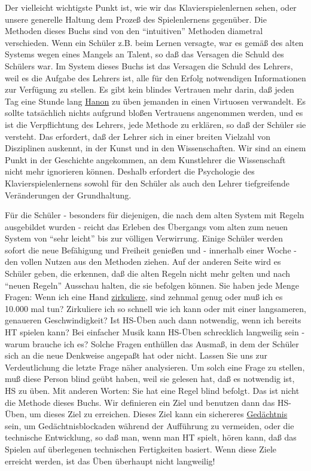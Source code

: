 Der vielleicht wichtigste Punkt ist, wie wir das Klavierspielenlernen sehen, oder unsere generelle Haltung dem Prozeß des Spielenlernens gegenüber.
Die Methoden dieses Buchs sind von den \enquote{intuitiven} Methoden diametral verschieden.
Wenn ein Schüler z.B. beim Lernen versagte, war es gemäß des alten Systems wegen eines Mangels an Talent, so daß das Versagen die Schuld des Schülers war.
Im System dieses Buchs ist das Versagen die Schuld des Lehrers, weil es die Aufgabe des Lehrers ist, alle für den Erfolg notwendigen Informationen zur Verfügung zu stellen.
Es gibt kein blindes Vertrauen mehr darin, daß jeden Tag eine Stunde lang \hyperlink{c1iii7h}{Hanon} zu üben jemanden in einen Virtuosen verwandelt.
Es sollte tatsächlich nichts aufgrund bloßen Vertrauens angenommen werden, und es ist die Verpflichtung des Lehrers, jede Methode zu erklären, so daß der Schüler sie versteht.
Das erfordert, daß der Lehrer sich in einer breiten Vielzahl von Disziplinen auskennt, in der Kunst und in den Wissenschaften.
Wir sind an einem Punkt in der Geschichte angekommen, an dem Kunstlehrer die Wissenschaft nicht mehr ignorieren können.
Deshalb erfordert die Psychologie des Klavierspielenlernens sowohl für den Schüler als auch den Lehrer tiefgreifende Veränderungen der Grundhaltung.

Für die Schüler - besonders für diejenigen, die nach dem alten System mit Regeln ausgebildet wurden - reicht das Erleben des Übergangs vom alten zum neuen System von \enquote{sehr leicht} bis zur völligen Verwirrung.
Einige Schüler werden sofort die neue Befähigung und Freiheit genießen und - innerhalb einer Woche - den vollen Nutzen aus den Methoden ziehen.
Auf der anderen Seite wird es Schüler geben, die erkennen, daß die alten Regeln nicht mehr gelten und nach \enquote{neuen Regeln} Ausschau halten, die sie befolgen können.
Sie haben jede Menge Fragen: Wenn ich eine Hand \hyperlink{c1iii2}{zirkuliere}, sind zehnmal genug oder muß ich es 10.000 mal tun?
Zirkuliere ich so schnell wie ich kann oder mit einer langsameren, genaueren Geschwindigkeit?
Ist HS-Üben auch dann notwendig, wenn ich bereits HT spielen kann?
Bei einfacher Musik kann HS-Üben schrecklich langweilig sein - warum brauche ich es?
Solche Fragen enthüllen das Ausmaß, in dem der Schüler sich an die neue Denkweise angepaßt hat oder nicht.
Lassen Sie uns zur Verdeutlichung die letzte Frage näher analysieren.
Um solch eine Frage zu stellen, muß diese Person blind geübt haben, weil sie gelesen hat, daß es notwendig ist, HS zu üben.
Mit anderen Worten: Sie hat eine Regel blind befolgt.
Das ist nicht die Methode dieses Buchs.
Wir definieren ein Ziel und benutzen dann das HS-Üben, um dieses Ziel zu erreichen.
Dieses Ziel kann ein sichereres \hyperlink{c1iii6}{Gedächtnis} sein, um Gedächtnisblockaden während der Aufführung zu vermeiden, oder die technische Entwicklung, so daß man, wenn man HT spielt, hören kann, daß das Spielen auf überlegenen technischen Fertigkeiten basiert.
Wenn diese Ziele erreicht werden, ist das Üben überhaupt nicht langweilig!

